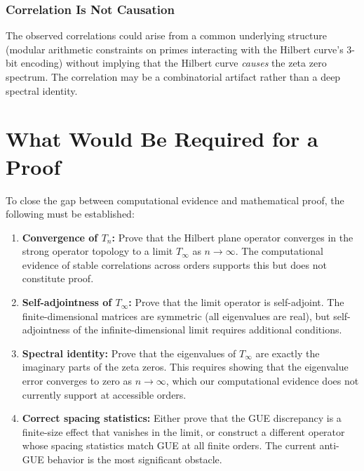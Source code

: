 \documentclass[11pt,a4paper]{article}
\begin{document}
\subsubsection{Correlation Is Not Causation}

The observed correlations could arise from a common underlying
structure (modular arithmetic constraints on primes interacting with
the Hilbert curve's 3-bit encoding) without implying that the Hilbert
curve \emph{causes} the zeta zero spectrum.  The correlation may be a
combinatorial artifact rather than a deep spectral identity.

\section{What Would Be Required for a Proof}

To close the gap between computational evidence and mathematical proof,
the following must be established:

\begin{enumerate}
\item \textbf{Convergence of $T_n$:} Prove that the Hilbert plane
   operator converges in the strong operator topology to a limit
   $T_\infty$ as $n \to \infty$.  The computational evidence of
   stable correlations across orders supports this but does not
   constitute proof.

\item \textbf{Self-adjointness of $T_\infty$:} Prove that the limit
   operator is self-adjoint.  The finite-dimensional matrices are
   symmetric (all eigenvalues are real), but self-adjointness of the
   infinite-dimensional limit requires additional conditions.

\item \textbf{Spectral identity:} Prove that the eigenvalues of
   $T_\infty$ are exactly the imaginary parts of the zeta zeros.
   This requires showing that the eigenvalue error converges to zero
   as $n \to \infty$, which our computational evidence does not
   currently support at accessible orders.

\item \textbf{Correct spacing statistics:} Either prove that the
   GUE discrepancy is a finite-size effect that vanishes in the
   limit, or construct a different operator whose spacing statistics
   match GUE at all finite orders.  The current anti-GUE behavior
   is the most significant obstacle.

\end{enumerate}
\end{document}

